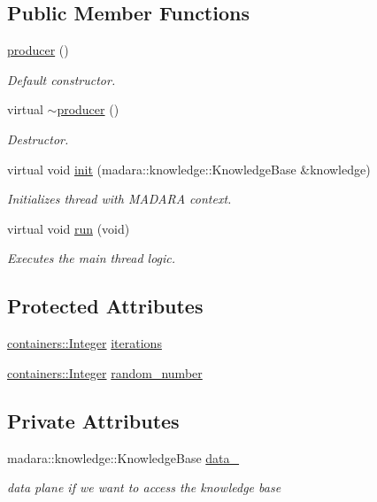 \subsection*{Public Member Functions}
\begin{DoxyCompactItemize}
\item 
\hyperlink{classthreads_1_1producer_a3863c51cfa32b07730d746f414546b37}{producer} ()
\begin{DoxyCompactList}\small\item\em Default constructor. \end{DoxyCompactList}\item 
virtual \hyperlink{classthreads_1_1producer_a2f807ac08bb0a2ad7912ff10cde3c44f}{$\sim$producer} ()
\begin{DoxyCompactList}\small\item\em Destructor. \end{DoxyCompactList}\item 
virtual void \hyperlink{classthreads_1_1producer_a1ec13d5979723407be381557c436fbbf}{init} (madara\+::knowledge\+::\+Knowledge\+Base \&knowledge)
\begin{DoxyCompactList}\small\item\em Initializes thread with M\+A\+D\+A\+RA context. \end{DoxyCompactList}\item 
virtual void \hyperlink{classthreads_1_1producer_aa060b439ac1979c44c8076b59cbe15f8}{run} (void)
\begin{DoxyCompactList}\small\item\em Executes the main thread logic. \end{DoxyCompactList}\end{DoxyCompactItemize}
\subsection*{Protected Attributes}
\begin{DoxyCompactItemize}
\item 
\hyperlink{controller_8cpp_a0584e2a15ee1231298f4501eca6bd1a0}{containers\+::\+Integer} \hyperlink{classthreads_1_1producer_ab1c9e99abf599d46572e47eca1299ca2}{iterations}
\item 
\hyperlink{controller_8cpp_a0584e2a15ee1231298f4501eca6bd1a0}{containers\+::\+Integer} \hyperlink{classthreads_1_1producer_a5ca9ba785a3f49123aea07f960e5497d}{random\+\_\+number}
\end{DoxyCompactItemize}
\subsection*{Private Attributes}
\begin{DoxyCompactItemize}
\item 
madara\+::knowledge\+::\+Knowledge\+Base \hyperlink{classthreads_1_1producer_a9cd75e08b351b2e4e13f3d5b3b4d9e67}{data\+\_\+}
\begin{DoxyCompactList}\small\item\em data plane if we want to access the knowledge base \end{DoxyCompactList}\end{DoxyCompactItemize}



